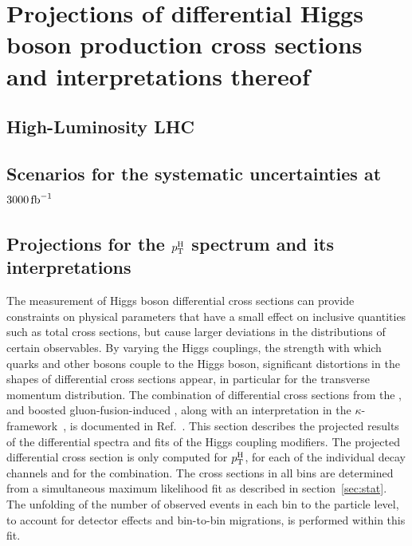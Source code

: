 \section{Projections of differential Higgs boson production cross sections and interpretations thereof}



\subsection{High-Luminosity LHC}



\subsection{Scenarios for the systematic uncertainties at \texorpdfstring{$3000\,\text{fb}^{-1}$}{3000 fb-1}}



\subsection{Projections for the  \texorpdfstring{$p_\mathrm{T}^\mathrm{H}$}{pT(H)} spectrum and its interpretations}


The measurement of Higgs boson differential cross sections can provide constraints on physical parameters that have a small effect on inclusive quantities such as total cross sections, but cause larger deviations in the distributions of certain observables.
% 
By varying the Higgs couplings, the strength with which quarks and other bosons couple to the Higgs boson, significant distortions in the shapes of differential cross sections appear, in particular for the transverse momentum distribution.
% 
The combination of differential cross sections from the \hgg, \hzz and boosted gluon-fusion-induced \hbb, along with an interpretation in the $\kappa$-framework~\cite{LHCHXSWGYR3}, is documented in Ref.~\cite{CMS-PAS-HIG-17-028}.
% 
This section describes the projected results of the differential spectra and fits of the Higgs coupling modifiers.
% 
The projected differential cross section is only computed for $p_\mathrm{T}^\mathrm{H}$, for each of the individual decay channels and for the combination.
% 
The cross sections in all bins are determined from a simultaneous maximum likelihood fit as described in section~\ref{sec:stat}. The unfolding of the number of observed events in each bin to the particle level, to account for detector effects and bin-to-bin migrations, is performed within this fit.

